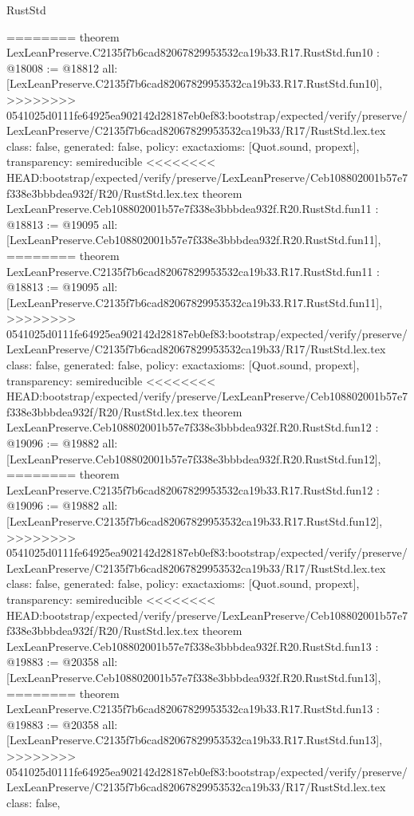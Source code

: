 \begin{lexlean}{RustStd}
\begin{coremodule}
{\begin{coremodule}
{{{{{{{{{{{{{========
theorem LexLeanPreserve.C2135f7b6cad82067829953532ca19b33.R17.RustStd.fun10 : @18008 := @18812 {
  all: [LexLeanPreserve.C2135f7b6cad82067829953532ca19b33.R17.RustStd.fun10],
>>>>>>>> 0541025d0111fe64925ea902142d28187eb0ef83:bootstrap/expected/verify/preserve/LexLeanPreserve/C2135f7b6cad82067829953532ca19b33/R17/RustStd.lex.tex
  class: false,
  generated: false,
  policy: exact{axioms: [Quot.sound, propext]},
  transparency: semireducible
}
<<<<<<<< HEAD:bootstrap/expected/verify/preserve/LexLeanPreserve/Ceb108802001b57e7f338e3bbbdea932f/R20/RustStd.lex.tex
theorem LexLeanPreserve.Ceb108802001b57e7f338e3bbbdea932f.R20.RustStd.fun11 : @18813 := @19095 {
  all: [LexLeanPreserve.Ceb108802001b57e7f338e3bbbdea932f.R20.RustStd.fun11],
========
theorem LexLeanPreserve.C2135f7b6cad82067829953532ca19b33.R17.RustStd.fun11 : @18813 := @19095 {
  all: [LexLeanPreserve.C2135f7b6cad82067829953532ca19b33.R17.RustStd.fun11],
>>>>>>>> 0541025d0111fe64925ea902142d28187eb0ef83:bootstrap/expected/verify/preserve/LexLeanPreserve/C2135f7b6cad82067829953532ca19b33/R17/RustStd.lex.tex
  class: false,
  generated: false,
  policy: exact{axioms: [Quot.sound, propext]},
  transparency: semireducible
}
<<<<<<<< HEAD:bootstrap/expected/verify/preserve/LexLeanPreserve/Ceb108802001b57e7f338e3bbbdea932f/R20/RustStd.lex.tex
theorem LexLeanPreserve.Ceb108802001b57e7f338e3bbbdea932f.R20.RustStd.fun12 : @19096 := @19882 {
  all: [LexLeanPreserve.Ceb108802001b57e7f338e3bbbdea932f.R20.RustStd.fun12],
========
theorem LexLeanPreserve.C2135f7b6cad82067829953532ca19b33.R17.RustStd.fun12 : @19096 := @19882 {
  all: [LexLeanPreserve.C2135f7b6cad82067829953532ca19b33.R17.RustStd.fun12],
>>>>>>>> 0541025d0111fe64925ea902142d28187eb0ef83:bootstrap/expected/verify/preserve/LexLeanPreserve/C2135f7b6cad82067829953532ca19b33/R17/RustStd.lex.tex
  class: false,
  generated: false,
  policy: exact{axioms: [Quot.sound, propext]},
  transparency: semireducible
}
<<<<<<<< HEAD:bootstrap/expected/verify/preserve/LexLeanPreserve/Ceb108802001b57e7f338e3bbbdea932f/R20/RustStd.lex.tex
theorem LexLeanPreserve.Ceb108802001b57e7f338e3bbbdea932f.R20.RustStd.fun13 : @19883 := @20358 {
  all: [LexLeanPreserve.Ceb108802001b57e7f338e3bbbdea932f.R20.RustStd.fun13],
========
theorem LexLeanPreserve.C2135f7b6cad82067829953532ca19b33.R17.RustStd.fun13 : @19883 := @20358 {
  all: [LexLeanPreserve.C2135f7b6cad82067829953532ca19b33.R17.RustStd.fun13],
>>>>>>>> 0541025d0111fe64925ea902142d28187eb0ef83:bootstrap/expected/verify/preserve/LexLeanPreserve/C2135f7b6cad82067829953532ca19b33/R17/RustStd.lex.tex
  class: false,
}}}}}}}}}}}}}}}}}
\end{coremodule}}
\end{coremodule}
\end{lexlean}
